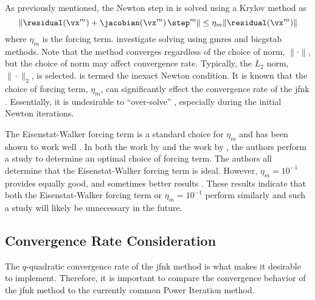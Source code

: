     As previously mentioned, the Newton step in  is solved
    using a Krylov method as
    \begin{equation}
      \label{eq:inexact_newton_condition}
      \| \residual(\vx^m) + \jacobian(\vx^m) \, \step^m \| \le 
        \eta_m \| \residual(\vx^m) \|
    \end{equation}
    where $\eta_m$ is the forcing term. \citeauthor{qe2paper} investigate
    solving  using \gls{gmres} and
    \gls{bicgstab} methods. Note that the method converges regardless of the
    choice of norm, $\| \cdot \|$, but the choice of norm may affect convergence
    rate.  Typically, the $L_2$ norm, $\| \cdot \|_2$, is selected.
     is termed the inexact Newton condition.
    It is known that the choice of forcing term, $\eta_m$, can significantly
    effect the convergence rate of the \gls{jfnk} \cite{textbookkelley}.
    Essentially, it is undesirable to ``over-solve''
    , especially during the initial Newton
    iterations.

    The Eisenstat-Walker forcing term is a standard choice for $\eta_m$ and has
    been shown to work well \cite{qe2paper,gill_azmy}. In both the work by
    \citeauthor{qe2paper} and the work by \citeauthor{gill_azmy}, the authors
    perform a study to determine an optimal choice of forcing term. The authors
    all determine that the Eisenstat-Walker forcing term is ideal. However,
    $\eta_m = 10^{-1}$ provides equally good, and sometimes better results
    \cite{qe2paper,gill_azmy,ma784notes}. These results indicate that both the
    Eisenstat-Walker forcing term or $\eta_m = 10^{-1}$ perform similarly and
    such a study will likely be unnecessary in the future.

  \subsection{Convergence Rate Consideration}
    The $q$-quadratic convergence rate of the \gls{jfnk} method is what makes it
    desirable to implement. Therefore, it is important to compare the
    convergence behavior of the \gls{jfnk} method to the currently common Power
    Iteration method.

